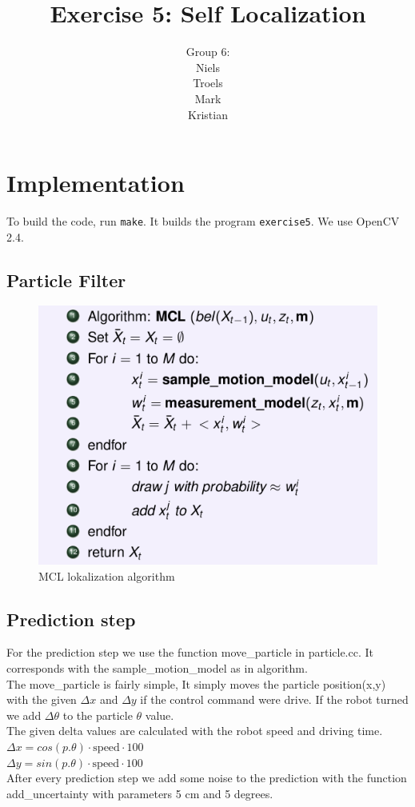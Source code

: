 \documentclass[a4paper,12pt]{article}
\title{Exercise 5: Self Localization}
\author{Group 6:\\Niels\\Troels\\Mark\\Kristian}
\begin{document}
\maketitle
\newpage
\section{Implementation}

To build the code, run \texttt{make}.  It builds the program
\texttt{exercise5}.  We use OpenCV 2.4.


\subsection{Particle Filter}
\begin{figure}[!h]
\centering
\includegraphics[scale=0.50]{MCL.png}
\caption{MCL lokalization algorithm}
\label{MCL}
\end{figure}
\subsection{Prediction step}
For the prediction step we use the function move\_particle in particle.cc. It corresponds with the sample\_motion\_model as in algorithm. \\
The move\_particle is fairly simple, It simply moves the particle position(x,y) with the given $\Delta x $ and $\Delta y$ if the control command were drive. If the robot turned we add $\Delta \theta$ to the particle $\theta$ value. \\
The given delta values are calculated with the robot speed and driving time. \\
$\Delta x = cos(p.\theta)\cdot\text{speed}\cdot 100$ \\
$\Delta y = sin(p.\theta)\cdot\text{speed}\cdot 100$ \\
After every prediction step we add some noise to the prediction with the function add\_uncertainty with parameters 5 cm and 5 degrees. 
\end{document}
